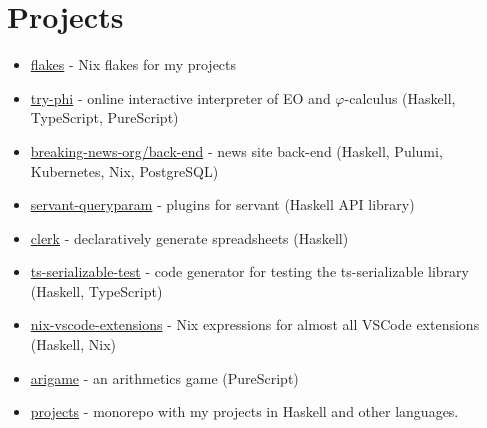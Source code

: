 \documentclass[twocolumn,11pt]{report}
\begin{document}
\section*{Projects}
\begin{itemize}
     \item \href{https://github.com/deemp/flakes#readme}{flakes} - Nix flakes for my projects
     \item \href{https://github.com/objectionary/try-phi#readme}{try-phi} - online interactive interpreter of EO and $\varphi$-calculus (Haskell, TypeScript, PureScript)
     \item \href{https://github.com/breaking-news-org/back-end#readme}{breaking-news-org/back-end} - news site back-end (Haskell, Pulumi, Kubernetes, Nix, PostgreSQL)
     \item \href{https://github.com/deemp/servant-queryparam#readme}{servant-queryparam} - plugins for servant (Haskell API library)
     \item \href{https://github.com/deemp/clerk#readme}{clerk} - declaratively generate spreadsheets (Haskell)
     \item \href{https://github.com/deemp/projects/tree/main/haskell/ts-serializable-test#readme}{ts-serializable-test} - code generator for testing the ts-serializable library (Haskell, TypeScript)
     \item \href{https://github.com/nix-community/nix-vscode-extensions#readme}{nix-vscode-extensions} - Nix expressions for almost all VSCode extensions (Haskell, Nix)
     \item \href{https://github.com/deemp/arigame#readme}{arigame} - an arithmetics game (PureScript)
     \item \href{https://github.com/deemp/projects#readme}{projects} - monorepo with my projects in Haskell and other languages.
\end{itemize}




\end{document}

